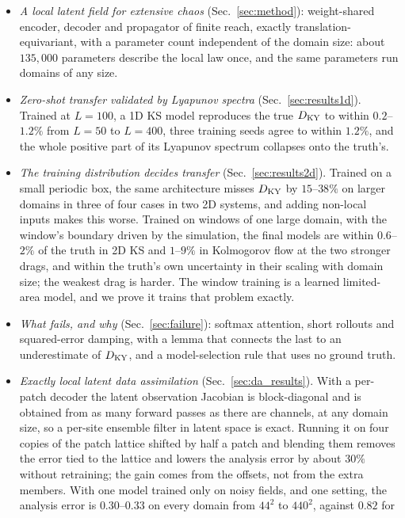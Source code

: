 \begin{itemize}
\item \emph{A local latent field for extensive chaos}
  (Sec.~\ref{sec:method}): weight-shared encoder, decoder and propagator
  of finite reach, exactly translation-equivariant, with a parameter
  count independent of the domain size: about $135{,}000$ parameters describe
  the local law once, and the same parameters run domains of any size.
\item \emph{Zero-shot transfer validated by Lyapunov spectra}
  (Sec.~\ref{sec:results1d}). Trained at $L=100$, a 1D KS model reproduces
  the true $D_{\mathrm{KY}}$ to within $0.2$--$1.2\%$ from $L=50$ to $L=400$, three
  training seeds agree to within $1.2\%$, and the whole positive part of
  its Lyapunov spectrum collapses onto the truth's.
\item \emph{The training distribution decides transfer}
  (Sec.~\ref{sec:results2d}). Trained on a small periodic box, the same
  architecture misses $D_{\mathrm{KY}}$ by $15$--$38\%$ on larger domains in three of
  four cases in two 2D systems, and adding non-local inputs makes this
  worse. Trained on
  windows of one large domain, with the window's boundary driven by the
  simulation, the final models are within $0.6$--$2\%$ of the truth in 2D
  KS and $1$--$9\%$ in Kolmogorov flow at the two stronger drags, and
  within the truth's own uncertainty in their scaling with domain size;
  the weakest drag is harder. The window training is a learned
  limited-area model, and we prove it trains that problem exactly.
\item \emph{What fails, and why} (Sec.~\ref{sec:failure}): softmax
  attention, short rollouts and squared-error damping, with a lemma that
  connects the last to an underestimate of $D_{\mathrm{KY}}$, and a model-selection
  rule that uses no ground truth.
\item \emph{Exactly local latent data assimilation}
  (Sec.~\ref{sec:da_results}). With a per-patch decoder the latent
  observation Jacobian is block-diagonal and is obtained from as many
  forward passes as there are channels, at any domain size, so a per-site
  ensemble filter in latent space is exact. Running it on four copies of the
  patch lattice shifted by half a patch and blending them removes the error
  tied to the lattice and lowers the analysis error by about $30\%$ without
  retraining; the gain comes from the offsets, not from the extra members.
  With one model trained only on noisy fields, and one setting, the analysis
  error is $0.30$--$0.33$ on every domain from $44^2$ to $440^2$, against $0.82$ for

\end{itemize}
